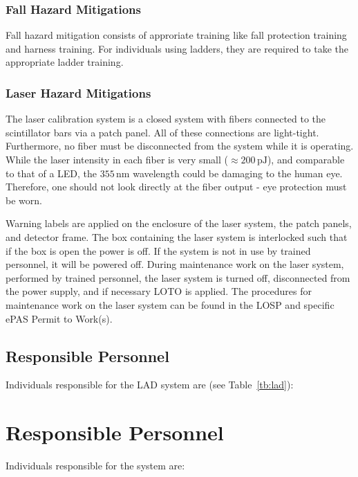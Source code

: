 \subsubsection{Fall Hazard Mitigations} 

Fall hazard mitigation consists of approriate training like fall protection training and harness training.  For individuals using
ladders,  they are required to take the appropriate ladder training.

\subsubsection{Laser Hazard Mitigations}

The laser calibration system is a closed system with fibers connected to the scintillator bars via a patch
panel.  All of these connections are light-tight.  Furthermore,  no fiber must be disconnected from the system
while it is operating.  While the laser intensity in each fiber is very small ($\approx 200\,\mathrm{pJ}$),
and comparable to that of a LED, the $355\,\mathrm{nm}$ wavelength could be damaging to the human eye.
Therefore,  one should not look directly at the fiber output - eye protection must be worn. 

Warning labels are applied on the enclosure of the laser system,  the patch panels,  and detector frame.  The
box containing the laser system is interlocked such that if the box is open the power is off.  If the system
is not in use by trained personnel,  it will be powered off.  During maintenance work on the laser system,
performed by trained personnel,  the laser system is turned off,  disconnected from the power supply,  and
if necessary LOTO is applied.  The procedures for maintenance work on the laser system can be found in the LOSP and specific ePAS Permit to Work(s).

\subsection{Responsible Personnel}
\indent

Individuals responsible for the LAD system are (see Table~\ref{tb:lad}):


\section{Responsible Personnel}
\label{sec:personnel}
Individuals responsible for the system are:

